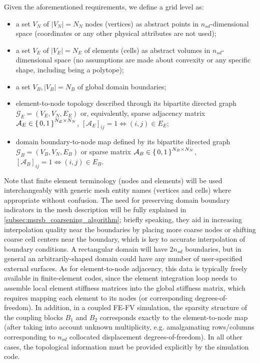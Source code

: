 Given the aforementioned requirements, we define a grid level as:
\begin{itemize}
    \item a set $V_N$ of $|V_N| = N_N$ nodes (vertices) as abstract points in $n_{sd}$-dimensional space (coordinates or any other physical attributes are not used);
    \item a set $V_E$ of $|V_E| = N_E$ of elements (cells) as abstract volumes in $n_{sd}$-dimensional space (no assumptions are made about convexity or any specific shape, including being a polytope);
    \item a set $V_B, |V_B| = N_B$ of global domain boundaries;
    \item element-to-node topology described through its bipartite directed graph $\mathcal{G}_E = (V_E,V_N,E_E)$ or, equivalently, sparse adjacency matrix $\mathcal{A}_{E} \in \set{0,1}^{N_E \times N_N}$, $[\mathcal{A}_E]_{ij} = 1 \Leftrightarrow (i,j) \in E_E$;
    \item domain boundary-to-node map defined by its bipartite directed graph $\mathcal{G}_B = (V_B,V_N,E_B)$ or sparse matrix $\mathcal{A}_{B} \in \set{0,1}^{N_B \times N_N}$, $[\mathcal{A}_B]_{ij} = 1 \Leftrightarrow (i,j) \in E_B$.
\end{itemize}
Note that finite element terminology (nodes and elements) will be used interchangeably with generic mesh entity names (vertices and cells) where appropriate without confusion.   The need for preserving domain boundary indicators in the mesh description will be fully explained in \cref{subsec:msrsb_coarsening_algorithm}; briefly speaking, they aid in increasing interpolation quality near the boundaries by placing more coarse nodes or shifting coarse cell centers near the boundary, which is key to accurate interpolation of boundary conditions.   A rectangular domain will have $2n_{sd}$ boundaries, but in general an arbitrarily-shaped domain could have any number of user-specified external surfaces.   As for element-to-node adjacency, this data is typically freely available in finite-element codes, since the element integration loop needs to assemble local element stiffness matrices into the global stiffness matrix, which requires mapping each element to its nodes (or corresponding degrees-of-freedom).   In addition, in a coupled FE-FV simulation, the sparsity structure of the coupling blocks $B_1$ and $B_2$ corresponds exactly to the element-to-node map (after taking into account unknown multiplicity, e.g. amalgamating rows/columns corresponding to $n_{sd}$ collocated displacement degrees-of-freedom).   In all other cases, the topological information must be provided explicitly by the simulation code.

